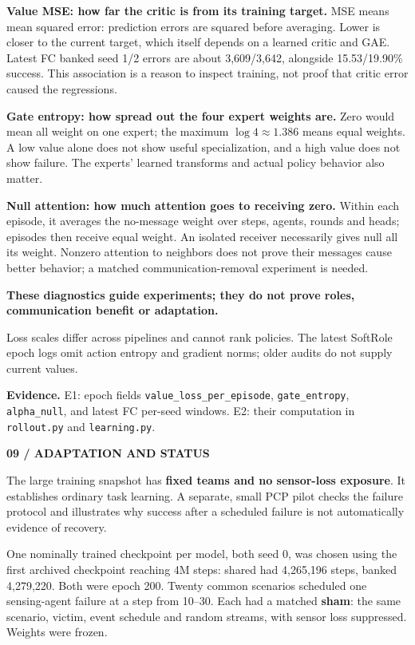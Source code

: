 \documentclass[11pt,letterpaper]{article}
\newcommand{\eyebrow}[1]{{\small\bfseries\color{teal}#1}\par\vspace{3pt}}
\newcommand{\pagetitle}[2]{\eyebrow{#1}{\fontsize{25}{28}\selectfont\bfseries #2\par}\vspace{7pt}}
\newcommand{\sub}[1]{\par\vspace{5pt}{\large\bfseries #1}\par\vspace{1pt}}
\newcommand{\takeaway}[1]{\par\vspace{5pt}\noindent\colorbox{pale}{\parbox{\dimexpr\linewidth-18pt\relax}{\vspace{5pt}\textbf{#1}\vspace{5pt}}}\par\vspace{3pt}}
\newcommand{\evidence}[1]{\vfill{\fontsize{8.4}{10.5}\selectfont\color{muted}\textbf{Evidence.} #1\par}}
\newcommand{\captiontext}[1]{\par{\fontsize{9}{11}\selectfont\color{muted}#1\par}}
\newcommand{\code}[1]{\nolinkurl{#1}}
\begin{document}
\textbf{Value MSE: how far the critic is from its training target.} MSE means mean squared error: prediction errors are squared before averaging. Lower is closer to the current target, which itself depends on a learned critic and GAE. Latest FC banked seed 1/2 errors are about 3,609/3,642, alongside 15.53/19.90\% success. This association is a reason to inspect training, not proof that critic error caused the regressions.

\textbf{Gate entropy: how spread out the four expert weights are.} Zero would mean all weight on one expert; the maximum $\log 4\approx1.386$ means equal weights. A low value alone does not show useful specialization, and a high value does not show failure. The experts' learned transforms and actual policy behavior also matter.

\textbf{Null attention: how much attention goes to receiving zero.} Within each episode, it averages the no-message weight over steps, agents, rounds and heads; episodes then receive equal weight. An isolated receiver necessarily gives null all its weight. Nonzero attention to neighbors does not prove their messages cause better behavior; a matched communication-removal experiment is needed.

\takeaway{These diagnostics guide experiments; they do not prove roles, communication benefit or adaptation.}
\captiontext{Loss scales differ across pipelines and cannot rank policies. The latest SoftRole epoch logs omit action entropy and gradient norms; older audits do not supply current values.}
\evidence{E1: epoch fields \code{value_loss_per_episode}, \code{gate_entropy}, \code{alpha_null}, and latest FC per-seed windows. E2: their computation in \code{rollout.py} and \code{learning.py}.}
\endgroup

\newpage
\pagetitle{09 / ADAPTATION AND STATUS}{The main research question is still open}
The large training snapshot has \textbf{fixed teams and no sensor-loss exposure}. It establishes ordinary task learning. A separate, small PCP pilot checks the failure protocol and illustrates why success after a scheduled failure is not automatically evidence of recovery.

\sub{What the sensor-loss pilot actually did}
One nominally trained checkpoint per model, both seed 0, was chosen using the first archived checkpoint reaching 4M steps: shared had 4,265,196 steps, banked 4,279,220. Both were epoch 200. Twenty common scenarios scheduled one sensing-agent failure at a step from 10--30. Each had a matched \textbf{sham}: the same scenario, victim, event schedule and random streams, with sensor loss suppressed. Weights were frozen.
\end{document}
